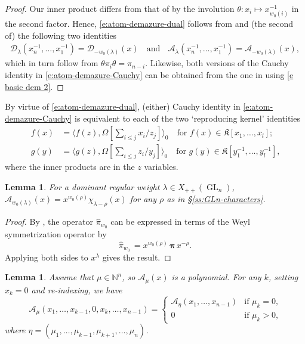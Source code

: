 \documentclass[12pt]{amsart}
\newtheorem{lemma}[thm]{Lemma}
\theoremstyle{definition}
\theoremstyle{remark}
\newcommand{\NN}{{\mathbb N}}
\newcommand{\pibold}{{\boldsymbol \pi }}
\newcommand{\Weyl}{\pibold }
\newcommand{\Dem}{\pi }
\newcommand{\DemAt}{\widehat{\pi}}
\newcommand{\Kfrak}{{\mathfrak K}}
\newcommand{\Acal}{{\mathcal A}}
\newcommand{\Dcal}{{\mathcal D}}
\DeclareMathOperator{\GL}{GL}
\begin{document}
\begin{proof}
Our inner product differs from that of \cite{FuLascoux09} by the
involution $\theta \colon x_i \mapsto x_{w_0(i)}^{-1}$ in the second
factor.  Hence, \eqref{e:atom-demazure-dual} follows from
\cite[eq.~(35)]{FuLascoux09} and (the second of) the following two
identities
\begin{align}\label{e basic dem 2}
\Dcal _{\lambda}(x_{n}^{-1},\ldots,x_{1}^{-1}) = \Dcal
_{-w_{0}(\lambda )}(x) \ \ \, \text{ and } \ \ \, \Acal
_{\lambda}(x_{n}^{-1},\ldots,x_{1}^{-1}) = \Acal _{-w_{0}(\lambda
)}(x),
\end{align}
which in turn follow from $\theta \Dem_{i} \theta = \Dem_{n-i}$.
Likewise, both versions of the Cauchy identity in
\eqref{e:atom-demazure-Cauchy} can be obtained from the one in
\cite[Theorem 6]{LascouxCrystal} using \eqref{e basic dem 2}.
\end{proof}

By virtue of \eqref{e:atom-demazure-dual},
(either) Cauchy identity in \eqref{e:atom-demazure-Cauchy}
is equivalent to each of the two
`reproducing kernel' identities
\begin{align}\label{e:atom-demazure-reproducing-1}
f(x) & = \langle f(z), \Omega [\sum _{i\leq j} x_{i}/z_{j}] \rangle
_{0}\quad \text{for $f(x)\in \Kfrak [x_{1},\ldots,x_{l}]$;}
\\
\label{e:atom-demazure-reproducing-2} g(y) & = \langle g(z), \Omega
[\sum _{i\leq j} z_{i}/y_{j}] \rangle _{0} \quad \text{for $g(y)\in
\Kfrak [y_{1}^{-1},\ldots,y_{l}^{-1}]$,}
\end{align}
where the inner products are in the  $z$ variables.

\begin{lemma}\label{l dom regular atom}
For a dominant regular weight $\lambda \in X_{++}(\GL_n)$, $\Acal_{w_0
(\lambda)}(x) = x^{w_0 (\rho)} \chi_{\lambda-\rho}(x)$ for any
$\rho$ as in \S \ref{ss:GLn-characters}.
\end{lemma}

\begin{proof}
By \cite[eq.~(1.5.3)]{Lascoux12}, the operator $\DemAt_{w_0}$ can be
expressed in terms of the Weyl symmetrization operator by
\begin{equation}\label{e:antidominant-atom}
\DemAt_{w_0} \, = x^{w_0 (\rho)} \, \Weyl \, x^{-\rho}.
\end{equation}
Applying both sides to  $x^\lambda$ gives the result.
\end{proof}

\begin{lemma}\label{lem:Amu-with-zero}
Assume that $\mu \in \NN ^{n}$, so $\Acal _{\mu }(x)$ is a polynomial.
For any $k$, setting $x_{k}=0$ and re-indexing, we have
\begin{equation}\label{e:Amu-with-zero}
\Acal _{\mu }(x_{1},\ldots,x_{k-1},0,x_{k},\ldots,x_{n-1}) =
\begin{cases} \Acal _{\eta }(x_{1},\ldots,x_{n-1})& \text{if $\mu _{k}=0$,}\\
0& \text{if $\mu _{k}>0$,}
\end{cases}
\end{equation}
where $\eta = (\mu _{1}, \ldots, \mu _{k-1}, \mu _{k+1}, \ldots, \mu
_{n})$.
\end{lemma}
\end{document}
